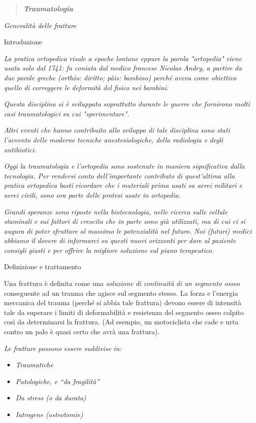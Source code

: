 \documentclass[]{article}
\date{}
\begin{document}
\begin{quote}
\emph{\textbf{Traumatologia}}
\end{quote}

\emph{Generalità delle fratture}

Introduzione

\protect\hypertarget{_bookmark1}{}{\protect\hypertarget{_bookmark2}{}{}}\emph{La
pratica ortopedica risale a epoche lontane eppure la parola "ortopedia"
viene usata solo dal 1741: fu coniata dal medico francese Nicolas Andry,
a partire da due parole greche (orthòs: diritto; pàis: bambino) perché
aveva come obiettivo quello di correggere le deformità del fisico nei
bambini.}

\emph{Questa disciplina si è sviluppata soprattutto durante le guerre
che fornirono molti casi traumatologici su cui "sperimentare".}

\emph{Altri eventi che hanno contribuito allo sviluppo di tale
disciplina sono stati l'avvento delle moderne tecniche anestesiologiche,
della radiologia e degli antibiotici.}

\emph{Oggi la traumatologia e l'ortopedia sono sostenute in maniera
significativa dalla tecnologia. Per rendersi conto dell'importante
contributo di quest'ultima alla pratica ortopedica basti ricordare che i
materiali prima usati su aerei militari e aerei civili, sono ora parte
delle protesi usate in ortopedia.}

\emph{Grandi speranze sono riposte nella biotecnologia, nelle ricerca
sulle cellule staminali e sui fattori di crescita che in parte sono già
utilizzati, ma di cui ci si augura di poter sfruttare al massimo le
potenzialità nel futuro. Noi (futuri) medici abbiamo il dovere di
informarci su questi nuovi orizzonti per dare al paziente consigli
giusti e per offrire la migliore soluzione sul piano terapeutico.}

Definizione e trattamento

Una frattura è definita come una \emph{soluzione di continuità di un
segmento osseo} conseguente ad un trauma che agisce sul segmento stesso.
La forza e l'energia meccanica del trauma (perché si abbia tale
frattura) devono essere di intensità tale da superare i limiti di
deformabilità e resistenza del segmento osseo colpito così da
determinarsi la frattura. (Ad esempio, un motociclista che cade e urta
contro un palo è quasi certo che avrà una frattura).

\emph{Le fratture possono essere suddivise in:}

\begin{itemize}
\item
  \emph{Traumatiche}
\item
  \emph{Patologiche, e ``da fragilità''}
\item
  \emph{Da stress (o da durata)}
\item
  \emph{Iatrogene (osteotomie)}
\end{itemize}
\end{document}
